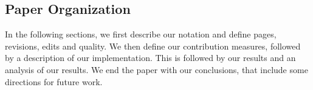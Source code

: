 \subsection{Paper Organization}

In the following sections, we first describe our notation and
define pages, revisions, edits and quality.
We then define our contribution measures, followed by a
description of our implementation.
This is followed by our results and an analysis of our results.
We end the paper with our conclusions, that include some directions
for future work.
